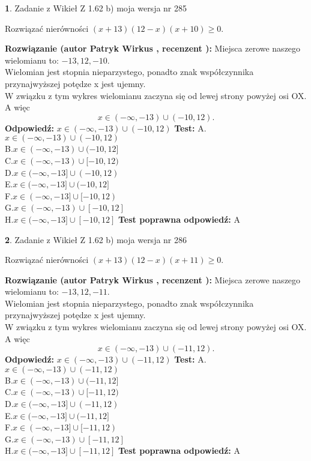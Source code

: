 \documentclass[12pt, a4paper]{article}
\theoremstyle{definition} %
\newtheorem{zad}{}
\newcommand{\zadStart}[1]{\begin{zad}#1\newline}
\newcommand{\zadStop}{\end{zad}}
\newcommand{\rozwStart}[2]{\noindent \textbf{Rozwiązanie (autor #1 , recenzent #2): }\newline}
\newcommand{\rozwStop}{\newline}
\newcommand{\odpStart}{\noindent \textbf{Odpowiedź:}\newline}
\newcommand{\odpStop}{\newline}
\newcommand{\testStart}{\noindent \textbf{Test:}\newline}
\newcommand{\testStop}{\newline}
\newcommand{\kluczStart}{\noindent \textbf{Test poprawna odpowiedź:}\newline}
\newcommand{\kluczStop}{\newline}
\begin{document}
\zadStart{Zadanie z Wikieł Z 1.62 b) moja wersja nr 285}

Rozwiązać nierówności $(x+13)(12-x)(x+10)\ge0$.
\zadStop
\rozwStart{Patryk Wirkus}{}
Miejsca zerowe naszego wielomianu to: $-13, 12, -10$.\\
Wielomian jest stopnia nieparzystego, ponadto znak współczynnika przy\linebreak najwyższej potędze x jest ujemny.\\ W związku z tym wykres wielomianu zaczyna się od lewej strony powyżej osi OX. A więc $$x \in (-\infty,-13) \cup (-10,12).$$
\rozwStop
\odpStart
$x \in (-\infty,-13) \cup (-10,12)$
\odpStop
\testStart
A.$x \in (-\infty,-13) \cup (-10,12)$\\
B.$x \in (-\infty,-13) \cup (-10,12]$\\
C.$x \in (-\infty,-13) \cup [-10,12)$\\
D.$x \in (-\infty,-13] \cup (-10,12)$\\
E.$x \in (-\infty,-13] \cup (-10,12]$\\
F.$x \in (-\infty,-13] \cup [-10,12)$\\
G.$x \in (-\infty,-13) \cup [-10,12]$\\
H.$x \in (-\infty,-13] \cup [-10,12]$
\testStop
\kluczStart
A
\kluczStop



\zadStart{Zadanie z Wikieł Z 1.62 b) moja wersja nr 286}

Rozwiązać nierówności $(x+13)(12-x)(x+11)\ge0$.
\zadStop
\rozwStart{Patryk Wirkus}{}
Miejsca zerowe naszego wielomianu to: $-13, 12, -11$.\\
Wielomian jest stopnia nieparzystego, ponadto znak współczynnika przy\linebreak najwyższej potędze x jest ujemny.\\ W związku z tym wykres wielomianu zaczyna się od lewej strony powyżej osi OX. A więc $$x \in (-\infty,-13) \cup (-11,12).$$
\rozwStop
\odpStart
$x \in (-\infty,-13) \cup (-11,12)$
\odpStop
\testStart
A.$x \in (-\infty,-13) \cup (-11,12)$\\
B.$x \in (-\infty,-13) \cup (-11,12]$\\
C.$x \in (-\infty,-13) \cup [-11,12)$\\
D.$x \in (-\infty,-13] \cup (-11,12)$\\
E.$x \in (-\infty,-13] \cup (-11,12]$\\
F.$x \in (-\infty,-13] \cup [-11,12)$\\
G.$x \in (-\infty,-13) \cup [-11,12]$\\
H.$x \in (-\infty,-13] \cup [-11,12]$
\testStop
\kluczStart
A
\kluczStop
\end{document}
